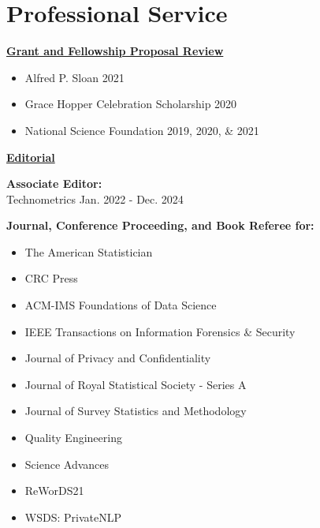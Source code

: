 \documentclass[11pt, letterpaper, roman]{moderncv} %
\begin{document}
\section{Professional Service}

\underline{\textbf{\large Grant and Fellowship Proposal Review}}\normalsize

\vspace{4pt}
\begin{itemize}
    \item Alfred P. Sloan \hfill 2021
    \item Grace Hopper Celebration Scholarship \hfill 2020
    \item National Science Foundation \hfill 2019, 2020, \& 2021
\end{itemize}

\vspace{12pt}
\underline{\textbf{\large Editorial}}\normalsize

\textbf{Associate Editor:}\\
Technometrics \hfill Jan. 2022 - Dec. 2024

\vspace{6pt}
\textbf{Journal, Conference Proceeding, and Book Referee for:}
\vspace{-6pt}
\begin{multicols}{2}
    \begin{itemize}
        \item The American Statistician
        \item CRC Press
        \item ACM-IMS Foundations of Data Science
        \item IEEE Transactions on Information Forensics \& Security
        \item Journal of Privacy and Confidentiality
        \item Journal of Royal Statistical Society - Series A
        \item Journal of Survey Statistics and Methodology
        \item Quality Engineering
        \item Science Advances
        \item ReWorDS21
        \item WSDS: PrivateNLP
    \end{itemize}
\end{multicols}
\end{document}
